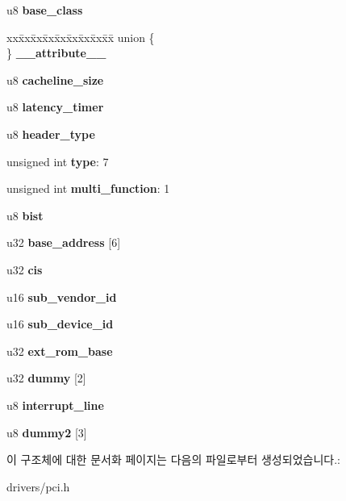 \begin{DoxyCompactItemize}
\item 
u8 {\bfseries base\-\_\-class}\label{structpci__config__space_afaeda48db0f6f7766964a988ce03d1c2}

\item 
\begin{tabbing}
xx\=xx\=xx\=xx\=xx\=xx\=xx\=xx\=xx\=\kill
union \{\\
\} {\bfseries \_\_attribute\_\_}\label{structpci__config__space_a5f21aec18b44eab179b16f6b349f15a6}
\\

\end{tabbing}\item 
u8 {\bfseries cacheline\-\_\-size}\label{structpci__config__space_a9d30cd8954616966696bfb5c6ccb41d8}

\item 
u8 {\bfseries latency\-\_\-timer}\label{structpci__config__space_adcc149ec855fcf86a9317f0f3df9f022}

\item 
u8 {\bfseries header\-\_\-type}\label{structpci__config__space_abfdce47c3419ff08cb740b3cb29fb558}

\item 
unsigned int {\bfseries type}\-: 7\label{structpci__config__space_a3555cd9d961881ce4ef4e776a5463ccc}

\item 
unsigned int {\bfseries multi\-\_\-function}\-: 1\label{structpci__config__space_a7781b09e1fe543c124be3ad47d1ff5ab}

\item 
u8 {\bfseries bist}\label{structpci__config__space_abc8eae00c6f63b2f4fb06b1ad0dafd60}

\item 
u32 {\bfseries base\-\_\-address} [6]\label{structpci__config__space_a29364b92cce2c313eb132325ef016504}

\item 
u32 {\bfseries cis}\label{structpci__config__space_a07a8eeefb7cac9c93c60183dd2d1f739}

\item 
u16 {\bfseries sub\-\_\-vendor\-\_\-id}\label{structpci__config__space_ab318a205b5172b730380b1544fd06c56}

\item 
u16 {\bfseries sub\-\_\-device\-\_\-id}\label{structpci__config__space_a06571b6d9147634135107330cec71437}

\item 
u32 {\bfseries ext\-\_\-rom\-\_\-base}\label{structpci__config__space_a6c3b3c4085a8e532f3ff93b8fc6e17c8}

\item 
u32 {\bfseries dummy} [2]\label{structpci__config__space_a08bea52a4576825eb5b66acab4f6171e}

\item 
u8 {\bfseries interrupt\-\_\-line}\label{structpci__config__space_a8e48e8f43d55905948b4621c431b9380}

\item 
u8 {\bfseries dummy2} [3]\label{structpci__config__space_aea63683e8b98ce03801d73976a293abd}

\end{DoxyCompactItemize}


이 구조체에 대한 문서화 페이지는 다음의 파일로부터 생성되었습니다.\-:\begin{DoxyCompactItemize}
\item 
drivers/pci.\-h\end{DoxyCompactItemize}

